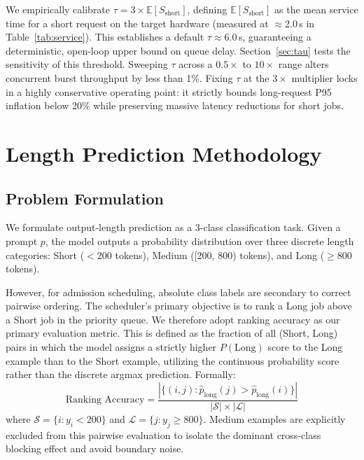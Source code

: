 \documentclass[10pt]{article}
\begin{document}
We empirically calibrate $\tau = 3 \times \mathbb{E}[S_{\text{short}}]$, defining $\mathbb{E}[S_{\text{short}}]$ as the mean service time for a short request on the target hardware (measured at $\approx$2.0\,s in Table~\ref{tab:service}). This establishes a default $\tau \approx 6.0$\,s, guaranteeing a deterministic, open-loop upper bound on queue delay. Section~\ref{sec:tau} tests the sensitivity of this threshold. Sweeping $\tau$ across a $0.5\times$ to $10\times$ range alters concurrent burst throughput by less than 1\%. Fixing $\tau$ at the $3\times$ multiplier locks in a highly conservative operating point: it strictly bounds long-request P95 inflation below 20\% while preserving massive latency reductions for short jobs.

\section{Length Prediction Methodology}
\label{sec:ml}

\subsection{Problem Formulation}
\label{sec:problem}

We formulate output-length prediction as a 3-class classification task. Given a prompt $p$, the model outputs a probability distribution over three discrete length categories: Short ($<$200 tokens), Medium ([200, 800) tokens), and Long ($\geq$800 tokens).

However, for admission scheduling, absolute class labels are secondary to correct pairwise ordering. The scheduler's primary objective is to rank a Long job above a Short job in the priority queue. We therefore adopt ranking accuracy as our primary evaluation metric. This is defined as the fraction of all (Short, Long) pairs in which the model assigns a strictly higher $P(\text{Long})$ score to the Long example than to the Short example, utilizing the continuous probability score rather than the discrete argmax prediction. Formally:
\begin{equation}
\text{Ranking Accuracy} = \frac{|\{(i,j) : \hat{p}_{\text{long}}(j) > \hat{p}_{\text{long}}(i)\}|}{|\mathcal{S}| \times |\mathcal{L}|}
\end{equation}
where $\mathcal{S} = \{i : y_i < 200\}$ and $\mathcal{L} = \{j : y_j \geq 800\}$. Medium examples are explicitly excluded from this pairwise evaluation to isolate the dominant cross-class blocking effect and avoid boundary noise.
\end{document}
